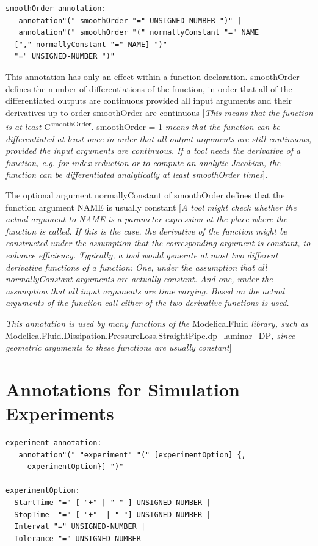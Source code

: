 \documentclass[10pt,a4paper]{report}
\def\doublelabel#1{\label{#1}}
\begin{document}
\begin{lstlisting}[language=grammar]
smoothOrder-annotation:
   annotation"(" smoothOrder "=" UNSIGNED-NUMBER ")" |
   annotation"(" smoothOrder "(" normallyConstant "=" NAME
  ["," normallyConstant "=" NAME] ")"
  "=" UNSIGNED-NUMBER ")"
\end{lstlisting}
This annotation has only an effect within a function declaration.
smoothOrder defines the number of differentiations of the function, in
order that all of the differentiated outputs are continuous provided all
input arguments and their derivatives up to order smoothOrder are
continuous {[}\emph{This means that the function is at least}
C\textsuperscript{smoothOrder}. smoothOrder = 1 \emph{means that the
function can be differentiated at least once in order that all output
arguments are still continuous, provided the input arguments are
continuous. If a tool needs the derivative of a function, e.g. for index
reduction or to compute an analytic Jacobian, the function can be
differentiated analytically at least smoothOrder times}{]}.

The optional argument normallyConstant of smoothOrder defines that the
function argument NAME is usually constant {[}\emph{A tool might check
whether the actual argument to NAME is a parameter expression at the
place where the function is called. If this is the case, the derivative
of the function might be constructed under the assumption that the
corresponding argument is constant, to enhance efficiency. Typically, a
tool would generate at most two different derivative functions of a
function: One, under the assumption that all normallyConstant arguments
are actually constant. And one, under the assumption that all input
arguments are time varying. Based on the actual arguments of the
function call either of the two derivative functions is used.}

\emph{This annotation is used by many functions of the} Modelica.Fluid
\emph{library, such as}
Modelica\allowbreak{}.Fluid\allowbreak{}.Dissipation\allowbreak{}.PressureLoss\allowbreak{}.StraightPipe\allowbreak{}.dp\_laminar\_DP\emph{,
since geometric arguments to these functions are usually constant}{]}

\section{Annotations for Simulation Experiments}\doublelabel{annotations-for-simulation-experiments}
\begin{lstlisting}[language=grammar]
experiment-annotation:
   annotation"(" "experiment" "(" [experimentOption] {,
     experimentOption}] ")"

experimentOption:
  StartTime "=" [ "+" | "-" ] UNSIGNED-NUMBER |
  StopTime  "=" [ "+"  | "-"] UNSIGNED-NUMBER |
  Interval "=" UNSIGNED-NUMBER |
  Tolerance "=" UNSIGNED-NUMBER
\end{lstlisting}
\end{document}
